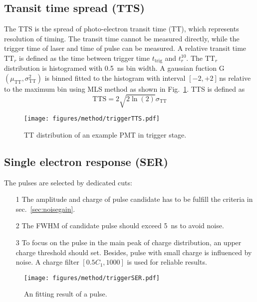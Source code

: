 \subsection{Transit time spread (TTS)}
The TTS is the spread of photo-electron transit time (TT), which represents resolution of timing. The transit time cannot be measured directly, while the trigger time of laser and time of pulse can be measured. A relative transit time $\mathrm{TT}_r$ is defined as the time between trigger time $t_{\mathrm{trig}}$ and $t_r^{10}$. The $\mathrm{TT}_r$ distribution is histogramed with \SI{0.5}{ns} bin width. A gaussian fuction G$(\mu_{\mathrm{TT}},\sigma_{\mathrm{TT}}^2)$ is binned fitted to the histogram with interval $[-2,+2]$\,ns relative to the maximum bin using MLS method as shown in Fig.~\ref{fig:triggerTTS}.
TTS is defined as
\begin{equation}
    \mathrm{TTS}=2\sqrt{2\ln(2)}\sigma_{\mathrm{TT}}
\end{equation}
\begin{figure}[!htbp]
    \centering
    \texttt{[image: figures/method/triggerTTS.pdf]}
    \caption{TT distribution of an example PMT in trigger stage.}
    \label{fig:triggerTTS}
\end{figure}

\subsection{Single electron response (SER)}
The pulses are selected by dedicated cuts:
\begin{itemize}
    \item[1] The amplitude and charge of pulse candidate has to be fulfill the criteria in sec.~\ref{sec:noisegain}.
    \item[2] The FWHM of candidate pulse should exceed \SI{5}{ns} to avoid noise.
    \item[3] To focus on the pulse in the main peak of charge distribution, an upper charge threshold should set. Besides, pulse with small charge is influenced by noise. A charge filter $[0.5C_1, 1000]$ is used for reliable results.
\end{itemize}

\begin{figure}
    \centering
    \texttt{[image: figures/method/triggerSER.pdf]}
    \caption{An fitting result of a pulse.}
    \label{fig:triggerser}
\end{figure}

